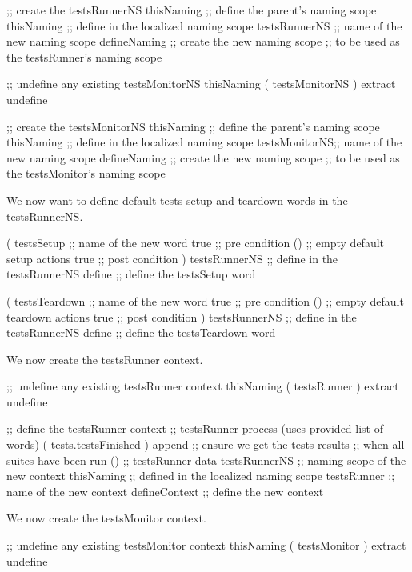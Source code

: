     ;; create the testsRunnerNS
    thisNaming    ;; define the parent's naming scope
    thisNaming    ;; define in the localized naming scope
    testsRunnerNS ;; name of the new naming scope
    defineNaming  ;; create the new naming scope
                  ;; to be used as the testsRunner's naming scope
\stopJoylolCode

\startJoylolCode
    ;; undefine any existing testsMonitorNS
    thisNaming
    ( testsMonitorNS ) extract
    undefine
  
    ;; create the testsMonitorNS
    thisNaming    ;; define the parent's naming scope
    thisNaming    ;; define in the localized naming scope
    testsMonitorNS;; name of the new naming scope
    defineNaming  ;; create the new naming scope
                  ;; to be used as the testsMonitor's naming scope
\stopJoylolCode

We now want to define default tests setup and teardown words in the 
testsRunnerNS. 

\startJoylolCode
    (
      testsSetup  ;; name of the new word
      { true }    ;; pre condition
      ()          ;; empty default setup actions
      { true }    ;; post condition
    ) 
    testsRunnerNS ;; define in the testsRunnerNS
    define        ;; define the testsSetup word
\stopJoylolCode

\startJoylolCode
    (
      testsTeardown ;; name of the new word
      { true }    ;; pre condition
      ()          ;; empty default teardown actions
      { true }    ;; post condition
    ) 
    testsRunnerNS ;; define in the testsRunnerNS
    define        ;; define the testsTeardown word
\stopJoylolCode

We now create the testsRunner context.

\startJoylolCode
    ;; undefine any existing testsRunner context
    thisNaming
    ( testsRunner ) extract
    undefine

    ;; define the testsRunner context
                  ;; testsRunner process (uses provided list of words)
    ( tests.testsFinished )
    append        ;; ensure we get the tests results
                  ;; when all suites have been run
    ()            ;; testsRunner data
    testsRunnerNS ;; naming scope of the new context
    thisNaming    ;; defined in the localized naming scope
    testsRunner   ;; name of the new context
    defineContext ;; define the new context
\stopJoylolCode

We now create the testsMonitor context.

\startJoylolCode
    ;; undefine any existing testsMonitor context
    thisNaming
    ( testsMonitor ) extract
    undefine

